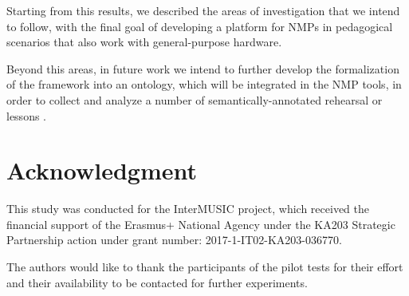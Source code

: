 \documentclass[conference]{IEEEtran}
\begin{document}
Starting from this results, we described the areas of investigation that we intend to follow, with the final goal of developing a platform for NMPs in pedagogical scenarios that also work with general-purpose hardware.

Beyond this areas, in future work we intend to further develop the formalization of the framework into an ontology, which will be integrated in the NMP tools, in order to collect and analyze a number of semantically-annotated rehearsal or lessons \cite{Kolazi2013}. 

\section*{Acknowledgment}
This study was conducted for the InterMUSIC project,
which received the financial support of the Erasmus+ National Agency under the KA203 Strategic Partnership action under grant number: 2017-1-IT02-KA203-036770.

The authors would like to thank the participants of the  pilot tests for their effort and their availability to be contacted for further experiments. 
\end{document}
